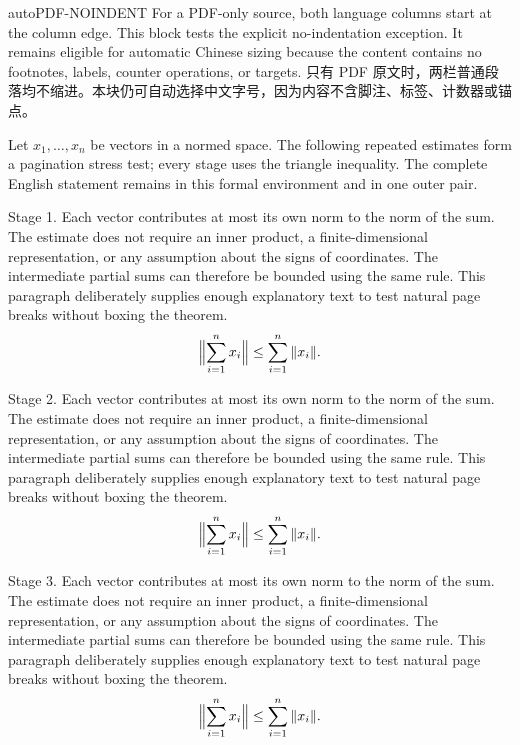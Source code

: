 \SourceHasTeXfalse
\begin{demopair}{auto}{PDF-NOINDENT}
For a PDF-only source, both language columns start at the column edge. This block tests the explicit no-indentation exception. It remains eligible for automatic Chinese sizing because the content contains no footnotes, labels, counter operations, or targets.
\switchcolumn
只有 PDF 原文时，两栏普通段落均不缩进。本块仍可自动选择中文字号，因为内容不含脚注、标签、计数器或锚点。
\end{demopair}\SourceHasTeXtrue
\clearpage
{}
\begin{pair}[\StatementKeepLines]
\hypertarget{theorem:1:en}{}\label{cross:start:en}
\begin{formaltheoremen}{}
Let $x_1,\ldots,x_n$ be vectors in a normed space. The following repeated estimates form a pagination stress test; every stage uses the triangle inequality. The complete English statement remains in this formal environment and in one outer pair.

\ENIndent Stage 1. Each vector contributes at most its own norm to the norm of the sum. The estimate does not require an inner product, a finite-dimensional representation, or any assumption about the signs of coordinates. The intermediate partial sums can therefore be bounded using the same rule. This paragraph deliberately supplies enough explanatory text to test natural page breaks without boxing the theorem.
\begin{equation*}\Bigl\|\sum_{i=1}^n x_i\Bigr\|\leq\sum_{i=1}^n\|x_i\|.\end{equation*}

\ENIndent Stage 2. Each vector contributes at most its own norm to the norm of the sum. The estimate does not require an inner product, a finite-dimensional representation, or any assumption about the signs of coordinates. The intermediate partial sums can therefore be bounded using the same rule. This paragraph deliberately supplies enough explanatory text to test natural page breaks without boxing the theorem.
\begin{equation*}\Bigl\|\sum_{i=1}^n x_i\Bigr\|\leq\sum_{i=1}^n\|x_i\|.\end{equation*}

\ENIndent Stage 3. Each vector contributes at most its own norm to the norm of the sum. The estimate does not require an inner product, a finite-dimensional representation, or any assumption about the signs of coordinates. The intermediate partial sums can therefore be bounded using the same rule. This paragraph deliberately supplies enough explanatory text to test natural page breaks without boxing the theorem.
\begin{equation*}\Bigl\|\sum_{i=1}^n x_i\Bigr\|\leq\sum_{i=1}^n\|x_i\|.\end{equation*}


\end{formaltheoremen}
\end{pair}
